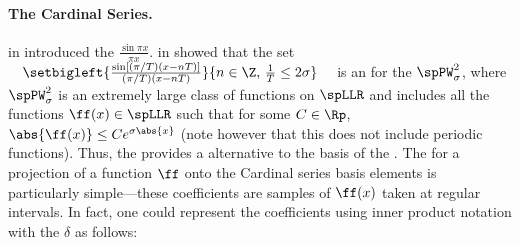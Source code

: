 \paragraph{The Cardinal Series.}
 in \citeyear{whittaker1915} introduced the 
$\frac{\sin\pi x}{\pi x}$.
\citeauthor{hardy1941} in \citeyear{hardy1941} showed that the  set
$\quad\setbigleft{\frac{\sin\left[(\pi/T)(x-nT)\right]}{(\pi/T)(x-nT)}}{n\in\Z,\,\frac{1}{T}\le2\sigma}\quad$
is an   for the  $\spPW_\sigma^2$,
where $\spPW_\sigma^2$ is an extremely large class of functions on $\spLLR$ and includes
all the functions $\ff(x)\in\spLLR$ such that for some $C\in\Rp$, $\abs{\ff(x)}\le Ce^{\sigma\abs{x}}$
(note however that this does not include periodic functions).\footnotemark
Thus, the  provides a  alternative to the  basis of the 
.
%
The   for a projection of a function $\ff$ onto the Cardinal series basis elements is particularly
simple---these coefficients are samples of $\ff(x)$ taken at regular intervals.
In fact, one could represent the coefficients using inner product notation with the
 $\delta$  as
follows: %
